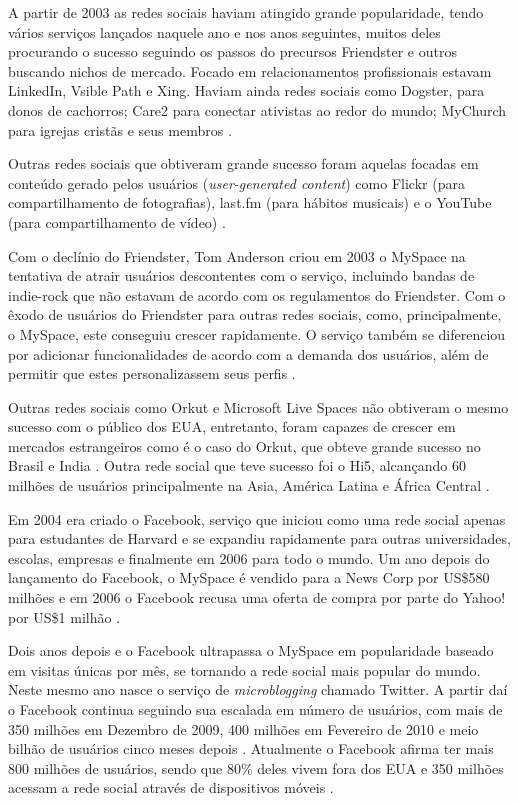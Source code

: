\documentclass[diss]{template/setrem}
\begin{document}
A partir de 2003 as redes sociais haviam atingido grande popularidade, tendo vários serviços lançados naquele ano e nos anos seguintes, muitos deles procurando o sucesso seguindo os passos do precursos Friendster e outros buscando nichos de mercado. Focado em relacionamentos profissionais estavam LinkedIn, Vsible Path e Xing. Haviam ainda redes sociais como Dogster, para donos de cachorros; Care2 para conectar ativistas ao redor do mundo; MyChurch para igrejas cristãs e seus membros \citep{Boyd2007}.

Outras redes sociais que obtiveram grande sucesso foram aquelas focadas em conteúdo gerado pelos usuários (\emph{user-generated content}) como Flickr (para compartilhamento de fotografias), last.fm (para hábitos musicais) e o YouTube (para compartilhamento de vídeo) \citep{Boyd2007}.

Com o declínio do Friendster, Tom Anderson criou em 2003 o MySpace na tentativa de atrair usuários descontentes com o serviço, incluindo bandas de indie-rock que não estavam de acordo com os regulamentos do Friendster. Com o êxodo de usuários do Friendster para outras redes sociais, como, principalmente, o MySpace, este conseguiu crescer rapidamente. O serviço também se diferenciou por adicionar funcionalidades de acordo com a demanda dos usuários, além de permitir que estes personalizassem seus perfis \citep{Boyd2007}.

Outras redes sociais como Orkut e Microsoft Live Spaces não obtiveram o mesmo sucesso com o público dos EUA, entretanto, foram capazes de crescer em mercados estrangeiros como é o caso do Orkut, que obteve grande sucesso no Brasil e India \citep{Boyd2007}. Outra rede social que teve sucesso foi o Hi5, alcançando 60 milhões de usuários principalmente na Asia, América Latina e África Central \citep{Chapman2009}.

Em 2004 era criado o Facebook, serviço que iniciou como uma rede social apenas para estudantes de Harvard e se expandiu rapidamente para outras universidades, escolas, empresas e finalmente em 2006 para todo o mundo. Um ano depois do lançamento do Facebook, o MySpace é vendido para a News Corp por US\$580 milhões e em 2006 o Facebook recusa uma oferta de compra por parte do Yahoo! por US\$1 milhão \citep{Chapman2009, Mofo2011}.

Dois anos depois e o Facebook ultrapassa o MySpace em popularidade baseado em visitas únicas por mês, se tornando a rede social mais popular do mundo. Neste mesmo ano nasce o serviço de \emph{microblogging} chamado Twitter. A partir daí o Facebook continua seguindo sua escalada em número de usuários, com mais de 350 milhões em Dezembro de 2009, 400 milhões em Fevereiro de 2010 e meio bilhão de usuários cinco meses depois \citep{Mofo2011}. Atualmente o Facebook afirma ter mais 800 milhões de usuários, sendo que 80\% deles vivem fora dos EUA e 350 milhões acessam a rede social através de dispositivos móveis \citep{Facebook2012b}.
\end{document}
